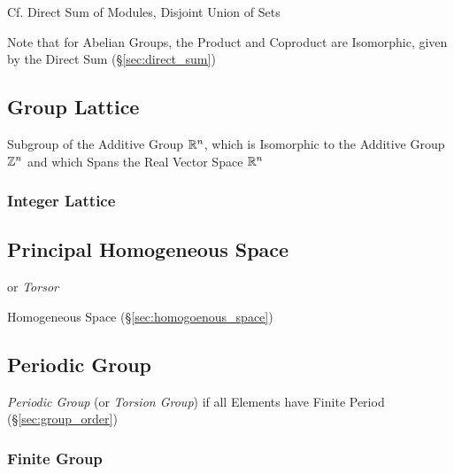 \fist Cf. Direct Sum of Modules, Disjoint Union of Sets

\fist Note that for Abelian Groups, the Product and Coproduct
are Isomorphic, given by the Direct Sum (\S\ref{sec:direct_sum})



\subsection{Group Lattice}\label{sec:group_lattice}

Subgroup of the Additive Group $\mathbb{R}^n$, which is Isomorphic to the Additive
Group $\mathbb{Z}^n$ and which Spans the Real Vector Space $\mathbb{R}^n$



\subsubsection{Integer Lattice}\label{sec:integer_lattice}



\subsection{Principal Homogeneous Space}\label{sec:principal_homogeneous_space}

or \emph{Torsor}

Homogeneous Space (\S\ref{sec:homogoenous_space})



\subsection{Periodic Group}\label{sec:periodic_group}

\emph{Periodic Group} (or \emph{Torsion Group}) if all Elements have
Finite Period (\S\ref{sec:group_order})



\subsubsection{Finite Group}\label{sec:finite_group}

